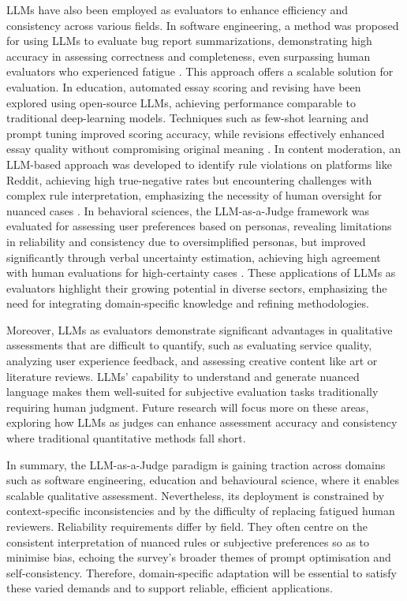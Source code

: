 LLMs have also been employed as evaluators to enhance efficiency and consistency across various fields. In software engineering, a method was proposed for using LLMs to evaluate bug report summarizations, demonstrating high accuracy in assessing correctness and completeness, even surpassing human evaluators who experienced fatigue \cite{kumar2024llms}. This approach offers a scalable solution for evaluation. In education, automated essay scoring and revising have been explored using open-source LLMs, achieving performance comparable to traditional deep-learning models. Techniques such as few-shot learning and prompt tuning improved scoring accuracy, while revisions effectively enhanced essay quality without compromising original meaning \cite{song2024automated}. In content moderation, an LLM-based approach was developed to identify rule violations on platforms like Reddit, achieving high true-negative rates but encountering challenges with complex rule interpretation, emphasizing the necessity of human oversight for nuanced cases \cite{kolla2024llm}. In behavioral sciences, the LLM-as-a-Judge framework was evaluated for assessing user preferences based on personas, revealing limitations in reliability and consistency due to oversimplified personas, but improved significantly through verbal uncertainty estimation, achieving high agreement with human evaluations for high-certainty cases \cite{dong2024can}. These applications of LLMs as evaluators highlight their growing potential in diverse sectors, emphasizing the need for integrating domain-specific knowledge and refining methodologies.

Moreover, LLMs as evaluators demonstrate significant advantages in qualitative assessments that are difficult to quantify, such as evaluating service quality, analyzing user experience feedback, and assessing creative content like art or literature reviews. LLMs' capability to understand and generate nuanced language makes them well-suited for subjective evaluation tasks traditionally requiring human judgment. Future research will focus more on these areas, exploring how LLMs as judges can enhance assessment accuracy and consistency where traditional quantitative methods fall short.

In summary, the LLM-as-a-Judge paradigm is gaining traction across domains such as software engineering, education and behavioural science, where it enables scalable qualitative assessment. Nevertheless, its deployment is constrained by context-specific inconsistencies and by the difficulty of replacing fatigued human reviewers. Reliability requirements differ by field. They often centre on the consistent interpretation of nuanced rules or subjective preferences so as to minimise bias, echoing the survey’s broader themes of prompt optimisation and self-consistency. Therefore, domain-specific adaptation will be essential to satisfy these varied demands and to support reliable, efficient applications.





